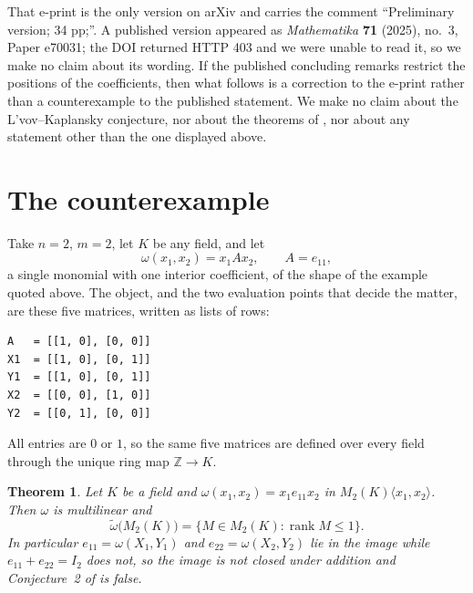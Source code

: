 \documentclass[11pt]{amsart}
\newtheorem{theorem}{Theorem}
\theoremstyle{remark}
\DeclareMathOperator{\rank}{rank}
\newcommand{\im}{\widetilde\omega}
\begin{document}
That e-print is the only version on arXiv and carries the comment
``Preliminary version; 34 pp;''. A published version appeared as
\emph{Mathematika} \textbf{71} (2025), no.~3, Paper e70031; the DOI returned
HTTP 403 and we were unable to read it, so we make no claim about its wording.
If the published concluding remarks restrict the positions of the
coefficients, then what follows is a correction to the e-print rather than a
counterexample to the published statement. We make no claim about the
L'vov--Kaplansky conjecture, nor about the theorems of \cite{PSS}, nor about
any statement other than the one displayed above.

\section{The counterexample}\label{sec:witness}

Take $n=2$, $m=2$, let $K$ be any field, and let
\[
  \omega(x_1,x_2)=x_1Ax_2,\qquad A=e_{11},
\]
a single monomial with one interior coefficient, of the shape of the example
quoted above. The object, and the two evaluation points that decide the
matter, are these five matrices, written as lists of rows:

\begin{verbatim}
A   = [[1, 0], [0, 0]]
X1  = [[1, 0], [0, 1]]
Y1  = [[1, 0], [0, 1]]
X2  = [[0, 0], [1, 0]]
Y2  = [[0, 1], [0, 0]]
\end{verbatim}

\noindent
All entries are $0$ or $1$, so the same five matrices are defined over every
field through the unique ring map $\mathbb Z\to K$.

\begin{theorem}\label{thm:main}
Let $K$ be a field and $\omega(x_1,x_2)=x_1e_{11}x_2$ in
$M_2(K)\langle x_1,x_2\rangle$. Then $\omega$ is multilinear and
\[
  \im\bigl(M_2(K)\bigr)=\{M\in M_2(K):\rank M\le1\}.
\]
In particular $e_{11}=\omega(X_1,Y_1)$ and $e_{22}=\omega(X_2,Y_2)$ lie in
the image while $e_{11}+e_{22}=I_2$ does not, so the image is not closed
under addition and Conjecture~2 of \cite{PSS} is false.
\end{theorem}
\end{document}

